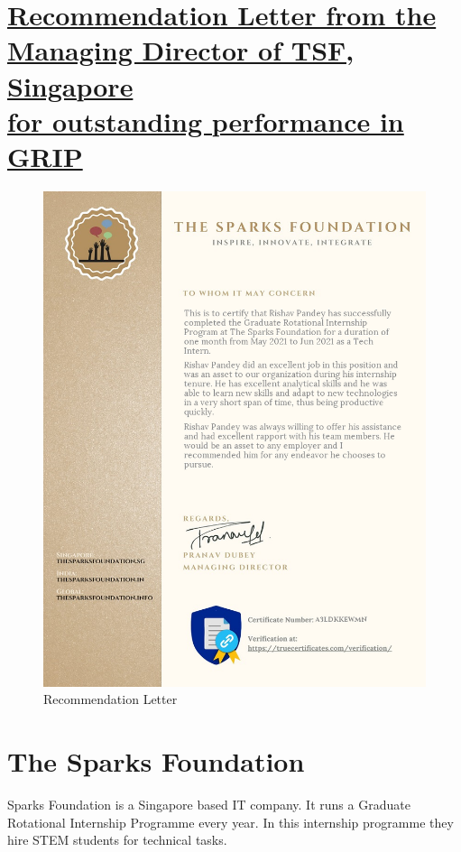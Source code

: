 \documentclass[12pt]{article}
\begin{document}
\section[Recommendation Letter from the\\ Managing Director of TSF, Singapore\\ for outstanding performance in GRIP]{\underline{Recommendation Letter from the}\\\underline{Managing Director of TSF, Singapore}\\\underline{for outstanding performance in GRIP}}
\begin{figure}[h]
\centering
\includegraphics[scale=0.375]{1642006136598.png}
\caption{Recommendation Letter}
\end{figure}
\clearpage

\section{The Sparks Foundation}
Sparks Foundation is a Singapore based IT company. It runs a Graduate Rotational Internship Programme every year. In this internship programme they hire STEM students for technical tasks.\\
\end{document}
